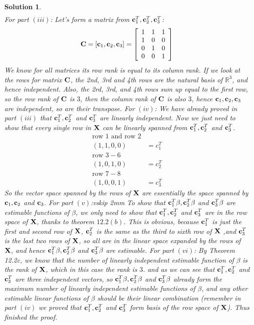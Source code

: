 \documentclass[11pt]{article}
\newtheorem{sol}{Solution}
\begin{document}
\begin{sol}
\begin{align*}
	\end{align*}
	For part $(iii)$:\vskip 2mm
	Let's form a matrix from ${\bf c}_1^T, {\bf c}_2^T, {\bf c}_3^T$:
	\begin{align*}
		{\bf C} = [{\bf c}_1, {\bf c}_2, {\bf c}_3] = \left[\begin{array}{ccc}1 &1&1\\ 1&0&0\\ 0&1&0\\ 0&0&1\end{array}\right]
	\end{align*}
	We know for all matrices its row rank is equal to its column rank. If we look at the rows for matrix ${\bf C}$, the 2nd, 3rd and 4th rows are the natural basis of $\mathbb{R}^3$, and hence independent. Also, the 2rd, 3rd, and 4th rows sum up equal to the first row, so the row rank of ${\bf C}$ is $3$, then the column rank of ${\bf C}$ is also $3$, hence ${\bf c}_1, {\bf c}_2, {\bf c}_3$ are independent, so are their transpose.\vskip 2mm
	For $(iv)$:\vskip 2mm
	We have already proved in part $(iii)$ that ${\bf c}_1^T, {\bf c}_2^T$ and ${\bf c}_3^T$ are linearly independent. Now we just need to show that every single row in ${\bf X}$ can be linearly spanned from ${\bf c}_1^T, {\bf c}_2^T$ and ${\bf c}_3^T$.\vskip 2mm
	\begin{align*}
		\text{row }1 \text{ and row }2&\ \\
		(1, 1, 0, 0) &= c_1^T\\
		\text{row }3-6 &\ \\
		(1, 0, 1, 0) &= c_2^T\\
		\text{row }7-8 &\ \\
		(1, 0, 0, 1) &= c_3^T
	\end{align*}
	So the vector space spanned by the rows of ${\bf X}$ are essentially the space spanned by ${\bf c}_1, {\bf c}_2$ and ${\bf c}_3$.\vskip 2mm
	For part $(v)$:vskip 2mm
	To show that ${\bf c}_1^T\beta, {\bf c}_2^T\beta$ and ${\bf c}_3^T\beta$ are estimable functions of $\beta$, we only need to show that ${\bf c}_1^T, {\bf c}_2^T$ and ${\bf c}_3^T$ are in the row space of ${\bf X}$, thanks to theorem $12.2(b)$. This is obvious, because ${\bf c}_1^T$ is just the first and second row of ${\bf X}$, ${\bf c}_2^T$ is the same as the third to sixth row of ${\bf X}$ ,and ${\bf c}_3^T$ is the last two rows of ${\bf X}$, so all are in the linear space expanded by the rows of ${\bf X}$, and hence ${\bf c}_1^T\beta, {\bf c}_2^T\beta$ and ${\bf c}_3^T\beta$ are estimable.\vskip 2mm
	For part $(vi)$:\vskip 2mm
	By Theorem 12.2c, we know that the number of linearly independent estimable function of $\beta$ is the rank of ${\bf X}$, which in this case the rank is $3$. and as we can see that ${\bf c}_1^T, {\bf c}_2^T$ and ${\bf c}_3^T$ are three independent vectors, so ${\bf c}_1^T\beta, {\bf c}_2^T\beta$ and ${\bf c}_3^T\beta$ already form the maximum number of linearly independent estimable functions of $\beta$, and any other estimable linear functions of $\beta$ should be their linear combination (remember in part $(iv)$ we proved that ${\bf c}_1^T, {\bf c}_2^T$ and ${\bf c}_3^T$ form basis of the row space of ${\bf X}$). Thus finished the proof.\vskip 2mm

\end{sol}
\end{document}
